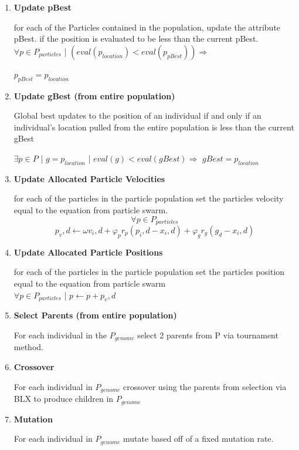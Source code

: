 \documentclass[twocolumn]{article}
\begin{document}
\begin{enumerate}[label=\alph*]


    \item  \textbf{Update pBest}
    
for each of the Particles contained in the population, update the attribute pBest. if the position is evaluated to be less than the current pBest.\\
$\forall p \in P_{particles}$ | $(eval(p_{location}) < eval(p_{pBest})) \Rightarrow$

$p_{pBest} = p_{location}$ 

    \item \textbf{Update gBest (from entire population)}
    
Global best updates to the position of an individual if and only if an individual's location pulled from the entire population is less than the current gBest

$\exists p \in P $ | $g = p_{location}$ | $eval(g) < eval(gBest) \Rightarrow$
$gBest = p_{location}$
    \item  \textbf{Update Allocated Particle Velocities}
    
for each of the particles in the particle population set the particles velocity equal to the equation from particle swarm.
$$\forall p \in P_{particles}$$
$$p_{v},d ← \omega v_i,d + \varphi _p r_p (p_i,d-x_i,d) + \varphi_ g r_g (g_d-x_i,d)$$
    \item \textbf{Update Allocated Particle Positions}
    
for each of the particles in the particle population set the particles position equal to the equation from particle swarm\\
$\forall p \in P_{particles} $ | $p ← p + p_v,d$
\item \textbf{Select Parents (from entire population)}
    
For each individual in the $P_{genome}$ select 2 parents from P via tournament method.

\item \textbf{Crossover}
    
For each individual in $P_{genome}$ crossover using the parents from selection via BLX to produce children in $P_{genome}$

\item \textbf{Mutation}

For each individual in $P_{genome}$ mutate based off of a fixed mutation rate.

\end{enumerate}
\end{document}
